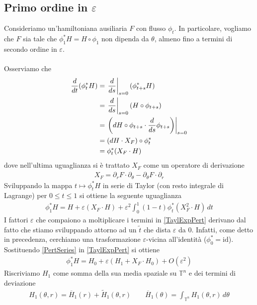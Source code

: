 \documentclass[twoside, 11pt]{amsbook}
\newcommand{\0}{{(0)}}
\newcommand{\3}{{(3)}}
\theoremstyle{colonplain}
\theoremstyle{colondefinition}
\theoremstyle{colonremark}
\numberwithin{equation}{chapter}
\begin{document}
\subsection{Primo ordine in $\varepsilon$} Consideriamo un'hamiltoniana ausiliaria $F$ con flusso $\phi_t$. In particolare, vogliamo che $F$ sia tale che $\phi^*_1H = H \circ \phi_1$ non dipenda da $\theta$, almeno fino a termini di secondo ordine in $\varepsilon$. \\ \\
Osserviamo che
\begin{align}
    \frac{d}{dt}(\phi^*_tH) &= \left.\frac{d}{ds}\right|_{s = 0}(\phi^*_{t + s}H) \notag \\
    &= \left.\frac{d}{ds}\right|_{s = 0}(H \circ \phi_{t + s}) \notag \\
    &= \left.\left(dH \circ \phi_{t + s} \cdot \frac{d}{ds}\phi_{t + s}\right)\right|_{s = 0} \notag \\
    &= (dH \cdot X_F) \circ \phi^*_t \notag \\
    &= \phi^*_t(X_F \cdot H) 
\end{align}
dove nell'ultima uguaglianza si è trattato $X_F$ come un operatore di derivazione
\begin{align}
    X_F = \partial_rF \cdot \partial_\theta - \partial_\theta F \cdot \partial_r 
\end{align}
Sviluppando la mappa $t \mapsto \phi^*_tH$ in serie di Taylor (con resto integrale di Lagrange) per $0 \leq t \leq 1$ si ottiene la seguente uguaglianza
\begin{align}\label{TaylExpPert}
    \phi^*_1H = H + \varepsilon(X_F \cdot H) + \varepsilon^2\int_0^1 (1 - t)\phi^*_t(X^2_F \cdot H) \, dt 
\end{align}
I fattori $\varepsilon$ che compaiono a moltiplicare i termini in \eqref{TaylExpPert} derivano dal fatto che stiamo sviluppando attorno ad un $\tilde{t}$ che dista $\varepsilon$ da $0$. Infatti, come detto in precedenza, cerchiamo una trasformazione $\varepsilon$-vicina all'identità ($\phi^*_0 = \mathrm{id}$). \\
Sostituendo \eqref{PertSeries} in \eqref{TaylExpPert} si ottiene
\begin{align}
    \phi^*_1H = H_0 + \varepsilon(H_1 + X_F \cdot H_0) + O(\varepsilon^2) 
\end{align}
Riscriviamo $H_1$ come somma della sua media spaziale su $\mathbb{T}^n$ e dei termini di deviazione
\begin{align}
    H_1(\theta, r) = \overline{H}_1(r) + \tilde{H}_1(\theta, r) \qquad \overline{H}_1(\theta) = \int_{\mathbb{T}^n} H_1(\theta, r) \, d\theta 
\end{align}
\end{document}
